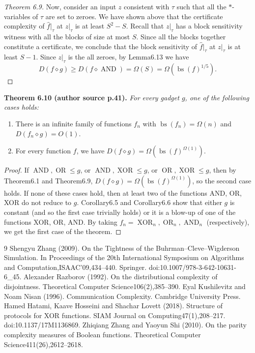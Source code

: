 \documentclass[10pt,a4paper]{article}
\newcommand{\comp}{\diamond}
\newcommand{\OR}{\operatorname{OR}}
\newcommand{\AND}{\operatorname{AND}}
\newcommand{\XOR}{\operatorname{XOR}}
\newenvironment{originalresult}[1]{\par\medskip\noindent\textbf{#1.}\itshape}{\par\medskip}
\begin{document}
\begin{proof}[Theorem 6.9]
Now, consider an input $z$ consistent with $\tau$ such that all the $*$-variables of $\tau$ are set to zeroes. We have shown above that the certificate complexity of $\hat f|_\tau$ at $z|_\tau$ is at least $S^2-S$. Recall that $z|_\tau$ has a block sensitivity witness with all the blocks of size at most $S$. Since all the blocks together constitute a certificate, we conclude that the block sensitivity of $\hat f|_\tau$ at $z|_\tau$ is at least $S-1$. Since $z|_\tau$ is the all zeroes, by Lemma6.13 we have
\[D(f\comp g)\ge D(f\comp\AND)=\Omega(S)=\Omega(\operatorname{bs}(f)^{1/5}).\]
\end{proof}

\begin{originalresult}{Theorem 6.10 (author source p.41)}
For every gadget $g$, one of the following cases holds:
\begin{enumerate}
\item[(i)] There is an infinite family of functions $f_n$ with $\operatorname{bs}(f_n)=\Omega(n)$ and $D(f_n\comp g)=O(1)$.
\item[(ii)] For every function $f$, we have $D(f\comp g)=\Omega(\operatorname{bs}(f)^{\Omega(1)})$.
\end{enumerate}
\end{originalresult}

\begin{proof}
If $\AND,\OR\le g$, or $\AND,\XOR\le g$, or $\OR,\XOR\le g$, then by Theorem6.1 and Theorem6.9, $D(f\comp g)=\Omega(\operatorname{bs}(f)^{\Omega(1)})$, so the second case holds.
If none of these cases hold, then at least two of the functions AND, OR, XOR do not reduce to $g$. Corollary6.5 and Corollary6.6 show that either $g$ is constant (and so the first case trivially holds) or it is a blow-up of one of the functions XOR, OR, AND. By taking $f_n=\XOR_n,\OR_n,\AND_n$ (respectively), we get the first case of the theorem.
\end{proof}

\begin{thebibliography}{9}
 Shengyu Zhang (2009). On the Tightness of the Buhrman--Cleve--Wigderson Simulation. In Proceedings of the 20th International Symposium on Algorithms and Computation,ISAAC'09,434--440. Springer. doi:10.1007/978-3-642-10631-6\_45.
 Alexander Razborov (1992). On the distributional complexity of disjointness. Theoretical Computer Science106(2),385--390.
 Eyal Kushilevitz and Noam Nisan (1996). Communication Complexity. Cambridge University Press.
 Hamed Hatami, Kaave Hosseini and Shachar Lovett (2018). Structure of protocols for XOR functions. SIAM Journal on Computing47(1),208--217. doi:10.1137/17M1136869.
 Zhiqiang Zhang and Yaoyun Shi (2010). On the parity complexity measures of Boolean functions. Theoretical Computer Science411(26),2612--2618.
\end{thebibliography}
\end{document}
